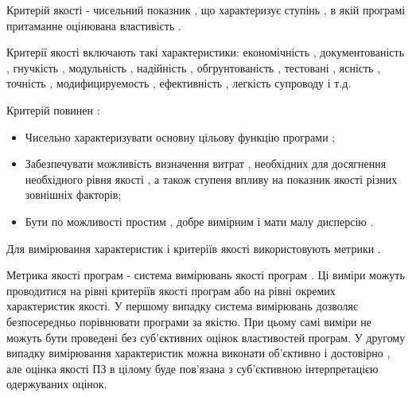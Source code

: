 Критерій якості - чисельний показник , що характеризує ступінь , в якій програмі притаманне оцінювана властивість .

Критерії якості включають такі характеристики: економічність , документованість , гнучкість , модульність , надійність , обгрунтованість , тестовані , ясність , точність , модифицируемость , ефективність , легкість супроводу і т.д.

Критерій повинен :
\begin{itemize}
\item {} 
Чисельно характеризувати основну цільову функцію програми ;

\item {} 
Забезпечувати можливість визначення витрат , необхідних для досягнення необхідного рівня якості , а також ступеня впливу на показник якості різних зовнішніх факторів;

\item {} 
Бути по можливості простим , добре вимірним і мати малу дисперсію .

\end{itemize}

Для вимірювання характеристик і критеріїв якості використовують метрики .

Метрика якості програм - система вимірювань якості програм . Ці виміри можуть проводитися на рівні критеріїв якості програм або на рівні окремих характеристик якості. У першому випадку система вимірювань дозволяє безпосередньо порівнювати програми за якістю. При цьому самі виміри не можуть бути проведені без суб'єктивних оцінок властивостей програм. У другому випадку вимірювання характеристик можна виконати об'єктивно і достовірно , але оцінка якості ПЗ в цілому буде пов'язана з суб'єктивною інтерпретацією одержуваних оцінок.

